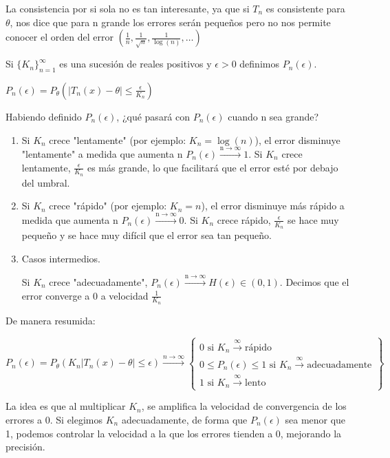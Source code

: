 La consistencia por si sola no es tan interesante, ya que si $T_n$ es consistente para $\theta$, nos dice que para n grande los errores serán pequeños pero no nos permite conocer el orden del error $\left(\frac{1}{n}, \frac{1}{\sqrt{n}},\frac{1}{\log(n)}, \dots\right)$

Si $\{K_n\}_{n=1}^{\infty}$ es una sucesión de reales positivos y $\epsilon>0$ definimos $P_n(\epsilon)$.

$P_n(\epsilon)=P_\theta(|T_n(x)-\theta| \leq \frac{\epsilon}{K_n})$

Habiendo definido $P_n(\epsilon)$, ¿qué pasará con  $P_n(\epsilon)$ cuando n sea grande?
\begin{enumerate}
    \item Si $K_n$ crece "lentamente" (por ejemplo:  $K_n=\log(n)$), el error disminuye "lentamente" a medida que aumenta n $P_n(\epsilon) \xrightarrow{{\text{n} \to \infty}} 1$. Si $K_n$ crece lentamente, $ \frac{\epsilon}{K_n}$ es más grande, lo que facilitará que el error esté por debajo del umbral.
    \item Si $K_n$ crece "rápido" (por ejemplo:  $K_n=n$), el error disminuye más rápido a medida que aumenta n $P_n(\epsilon) \xrightarrow{{\text{n} \to \infty}} 0$.  Si $K_n$ crece rápido, $ \frac{\epsilon}{K_n}$ se hace muy pequeño y se hace muy difícil que el error sea tan pequeño.
    \item Casos intermedios.

          Si $K_n$ crece "adecuadamente", $P_n(\epsilon) \xrightarrow{{\text{n} \to \infty}} H(\epsilon) \in (0,1)$. Decimos que el error converge a 0 a velocidad $\frac{1}{K_n}$
\end{enumerate}
De manera resumida:

\[
    P_n(\epsilon) = P_\theta(K_n|T_n(x) - \theta| \leq \epsilon) \xrightarrow{n \to \infty}\begin{Bmatrix}
        0 \text{ si } K_n \xrightarrow{\infty} \text{rápido}                                  \\
        0 \leq P_n(\epsilon) \leq 1 \text{ si } K_n \xrightarrow{\infty} \text{adecuadamente} \\
        1 \text{ si } K_n \xrightarrow{\infty} \text{lento}
    \end{Bmatrix}
\]

La idea es que al multiplicar $K_n$, se amplifica la velocidad de convergencia de los errores a 0. Si elegimos $K_n$ adecuadamente, de forma que $P_n(\epsilon)$ sea menor que 1, podemos controlar la velocidad a la que los errores tienden a 0, mejorando la precisión.